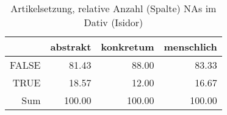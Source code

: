 \begin{table}[ht]
\centering
\begin{tabular}{rrrr}
  \hline
 & abstrakt & konkretum & menschlich \\ 
  \hline
FALSE & 81.43 & 88.00 & 83.33 \\ 
  TRUE & 18.57 & 12.00 & 16.67 \\ 
  Sum & 100.00 & 100.00 & 100.00 \\ 
   \hline
\end{tabular}
\caption{Artikelsetzung, relative Anzahl (Spalte) NAs im Dativ (Isidor)} 
\end{table}
